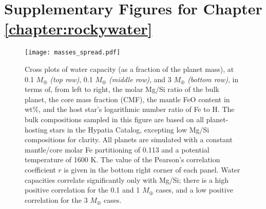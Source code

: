 \clearpage

\begingroup
\titlespacing*{\section}{0pt}{20pt}{70pt}  %





\tochide\section{Supplementary Figures for Chapter \ref{chapter:rockywater}}
\label{sec:supp-rockywater}


\begin{figure}[!h]
         \centering
         \texttt{[image: masses\_spread.pdf]}
        \caption[Cross plots of mantle water capacity with additional model parameters.]{Cross plots of water capacity (as a fraction of the planet mass), at 0.1 $M_\oplus$ \textit{(top row)}, 0.1 $M_\oplus$ \textit{(middle row)}, and 3 $M_\oplus$ \textit{(bottom row)}, in terms of, from left to right, the molar Mg/Si ratio of the bulk planet, the core mass fraction (CMF), the mantle FeO content in wt\%, and the host star's logarithmic number ratio of Fe to H. The bulk compositions sampled in this figure are based on all planet-hosting stars in the Hypatia Catalog, excepting low Mg/Si compositions for clarity. All planets are simulated with a constant mantle/core molar Fe partitioning of 0.113 and a potential temperature of 1600 K. The value of the Pearson's correlation coefficient $r$ is given in the bottom right corner of each panel. Water capacities correlate significantly only with Mg/Si; there is a high positive correlation for the 0.1 and 1 $M_\oplus$ cases, and a low positive correlation for the 3 $M_\oplus$ cases.}
        \label{fig:wmf_scatter}
\end{figure}


